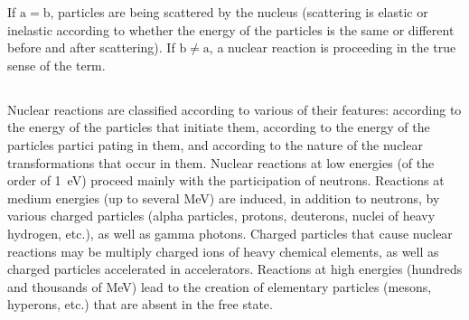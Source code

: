 If $\mathrm{a} = \mathrm{b}$, particles are being scattered by the nucleus (scattering is elastic or inelastic according to whether the energy of the particles is the same or different before and after scattering). If $\mathrm{b} \neq \mathrm{a}$, a nuclear reaction is proceeding in the true sense of the term.

\subsection{}\label{42.9.5} Nuclear reactions are classified according to various of their features: according to the energy of the particles that initiate them, according to the energy of the particles partici­ pating in them, and according to the nature of the nuclear transformations
that occur in them. Nuclear reactions at low energies
(of the order of \SI{1}{\eV}) proceed mainly with the participation of neutrons. Reactions at medium energies (up to several \si{\MeV}) are induced, in addition to neutrons, by various charged particles (alpha particles, protons, deuterons, nuclei of heavy hydrogen, etc.), as well as gamma photons. Charged particles that cause nuclear reactions may be multiply charged ions of heavy chemical elements, as well as charged particles accelerated in accelerators. Reactions at high energies (hundreds and thousands of \si{\MeV}) lead to the creation of elementary particles (mesons, hyperons, etc.) that are absent in the free state.


